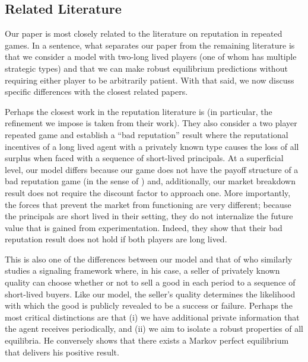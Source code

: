 \documentclass[11pt,reqno]{amsart}
\begin{document}
\subsection{Related Literature}\label{sec:rel_lit}

Our paper is most closely related to the literature on reputation in repeated games. In a sentence, what separates our paper from the remaining literature is that we consider a model with two-long lived players (one of whom has multiple strategic types) and that we can make robust equilibrium predictions without requiring either player to be arbitrarily patient. With that said, we now discuss specific differences with the closest related papers.

Perhaps the closest work in the reputation literature is \cite{ely2003} (in particular, the refinement we impose is taken from their work). They also consider a two player repeated game and establish a ``bad reputation'' result where the reputational incentives of a long lived agent with a privately known type causes the loss of all surplus when faced with a sequence of short-lived principals. At a superficial level, our model differs because our game does not have the payoff structure of a bad reputation game (in the sense of \cite{ely2008}) and, additionally, our market breakdown result does not require the discount factor to approach one. More importantly, the forces that prevent the market from functioning are very different; because the principals are short lived in their setting, they do not internalize the future value that is gained from experimentation. Indeed, they show that their bad reputation result does not hold if both players are long lived.

This is also one of the differences between our model and that of \citet{bar-isaac2003} who similarly studies a signaling framework where, in his case, a seller of privately known quality can choose whether or not to sell a good in each period to a sequence of short-lived buyers. Like our model, the seller's quality determines the likelihood with which the good is publicly revealed to be a success or failure. Perhaps the most critical distinctions are that (i) we have additional private information that the agent receives periodically, and (ii) we aim to isolate a robust properties of all equilibria. He conversely shows that there exists a Markov perfect equilibrium that delivers his positive result.
\end{document}
